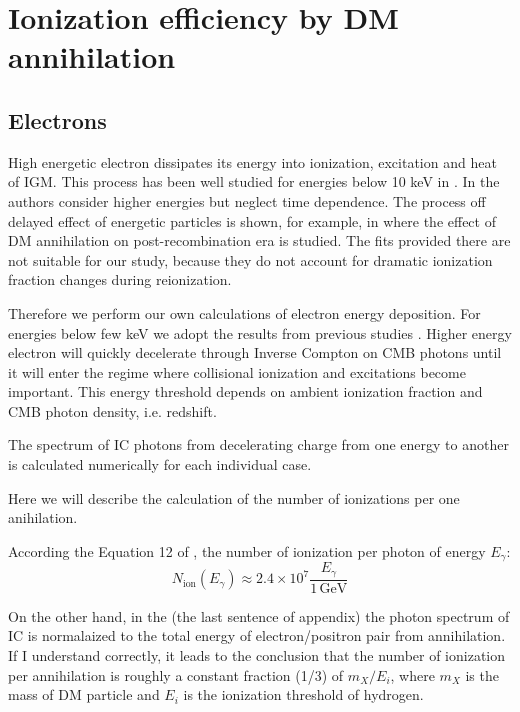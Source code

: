 \section{Ionization efficiency by DM annihilation}
\label{sec:DMspectrum}

\subsection{Electrons}

High energetic electron dissipates its energy into ionization, excitation and heat of IGM. This process has been well studied for energies below 10 keV in \cite{Shull_1979,Shull_1985,Dalgarno_1999,Furlanetto_2010}. In \cite{Vald_s_2010} the authors consider higher energies but neglect time dependence. The process off delayed effect of energetic particles is shown, for example, in \cite{2015arXiv150603812S} where the effect of DM annihilation on post-recombination era is studied. The fits provided there are not suitable for our study, because they do not account for dramatic ionization fraction changes during reionization.

Therefore we perform our own calculations of electron energy deposition. For energies below few keV we adopt the results from previous studies \cite{Shull_1985,Furlanetto_2010}. Higher energy electron will quickly decelerate through Inverse Compton on CMB photons until it will enter the regime where collisional ionization and excitations become important. This energy threshold depends on ambient ionization fraction and CMB photon density, i.e. redshift.

The spectrum of IC photons from decelerating charge from one energy to another is calculated numerically for each individual case.

Here we will describe the calculation of the number of ionizations per one anihilation.

According the Equation 12 of \cite{Belikov_2009}, the number of ionization per photon of energy $E_\gamma$:
\begin{equation}
N_\mathrm{ion}(E_\gamma) \approx 2.4\times10^7\dfrac{E_\gamma}{1\,\mathrm{GeV}}
\end{equation}

On the other hand, in the \cite{Belikov_2010} (the last sentence of appendix) the photon spectrum of IC is normalaized to the total energy of electron/positron pair from annihilation. If I understand correctly, it leads to the conclusion that the number of ionization per annihilation is roughly a constant fraction (1/3) of $m_X/E_i$, where $m_X$ is the mass of DM particle and $E_i$ is the ionization threshold of hydrogen.
    
    
    